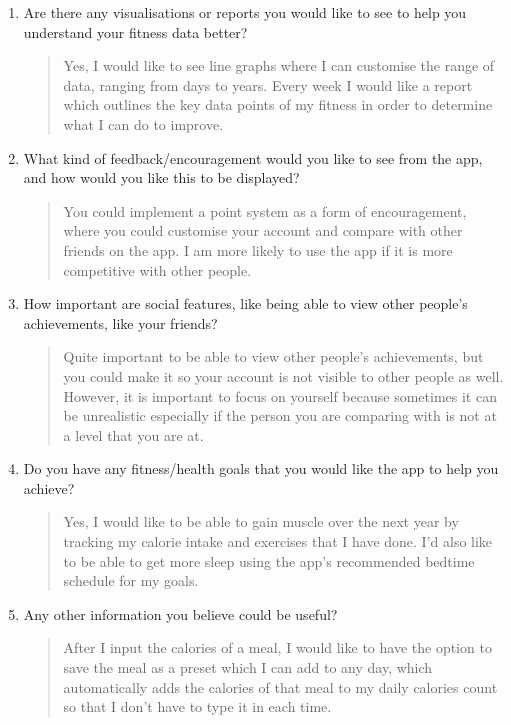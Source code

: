\documentclass[11pt]{article}
\begin{document}
\begin{enumerate}[label=\textbf{Q\arabic*:}, resume, leftmargin=*, align=left]
    \item Are there any visualisations or reports you would like to see to help you understand your fitness data better?
    \begin{quote}
        Yes, I would like to see line graphs where I can customise the range of data, ranging from days to years. Every week I would like a report which outlines the key data points of my fitness in order to determine what I can do to improve.
    \end{quote}

    \item What kind of feedback/encouragement would you like to see from the app, and how would you like this to be displayed?
    \begin{quote}
        You could implement a point system as a form of encouragement, where you could customise your account and compare with other friends on the app. I am more likely to use the app if it is more competitive with other people.
    \end{quote}

    \item How important are social features, like being able to view other people’s achievements, like your friends?
    \begin{quote}
        Quite important to be able to view other people’s achievements, but you could make it so your account is not visible to other people as well. However, it is important to focus on yourself because sometimes it can be unrealistic especially if the person you are comparing with is not at a level that you are at.
    \end{quote}

    \item Do you have any fitness/health goals that you would like the app to help you achieve?
    \begin{quote}
        Yes, I would like to be able to gain muscle over the next year by tracking my calorie intake and exercises that I have done. I’d also like to be able to get more sleep using the app’s recommended bedtime schedule for my goals.
    \end{quote}

    \item Any other information you believe could be useful?
    \begin{quote}
        After I input the calories of a meal, I would like to have the option to save the meal as a preset which I can add to any day, which automatically adds the calories of that meal to my daily calories count so that I don’t have to type it in each time.
    \end{quote}
\end{enumerate}
\end{document}
